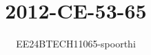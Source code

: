 \documentclass[journal]{IEEEtran}
\begin{document}

\vspace{3cm}

\title{2012-CE-53-65}
\author{EE24BTECH11065-spoorthi}
{\let\newpage\relax\maketitle}

\renewcommand{\thefigure}{\theenumi}
\renewcommand{\thetable}{\theenumi}
\setlength{\intextsep}{10pt} %


\renewcommand{\thetable}{\theenumi}
\end{document}

